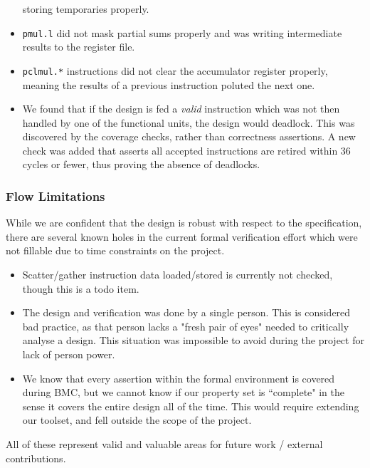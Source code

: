\begin{itemize}
    storing temporaries properly.
\item {\tt pmul.l} did not mask partial sums properly and was writing
    intermediate results to the register file.
\item {\tt pclmul.*} instructions did not clear the accumulator register
    properly, meaning the results of a previous instruction poluted the
    next one.
\item We found that if the design is fed a {\em valid} instruction which
    was not then handled by one of the functional units, the design would
    deadlock.
    This was discovered by the coverage checks, rather than correctness
    assertions.
    A new check was added that asserts all accepted instructions are
    retired within 36 cycles or fewer, thus proving the absence of
    deadlocks.
\end{itemize}


\subsubsection{Flow Limitations}

While we are confident that the design is robust with respect to the
specification, there are several known holes in the current formal
verification effort which were not fillable due to time constraints on
the project.

\begin{itemize}
\item Scatter/gather instruction data loaded/stored is currently
    not checked, though this is a todo item.
\item The design and verification was done by a single person. This
    is considered bad practice, as that person lacks a "fresh pair
    of eyes" needed to critically analyse a design.
    This situation was impossible to avoid during the project for
    lack of person power.
\item We know that every assertion within the formal environment is
    covered during BMC, but we cannot know if our property set is
    ``complete" in the sense it covers the entire design all of the
    time.
    This would require extending our toolset, and fell outside the
    scope of the project.
\end{itemize}

\noindent
All of these represent valid and valuable areas for future work /
external contributions.
